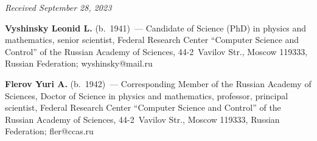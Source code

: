 \vspace*{-6pt}

\hfill{\small\textit{Received September 28, 2023}} 

\vspace*{-18pt}
 
      \Contr

      
  \noindent
  \textbf{Vyshinsky Leonid L.} (b.\ 1941)~--- Candidate of Science (PhD) in physics and 
mathematics, senior scientist, Federal Research Center ``Computer Science and Control'' of the 
Russian Academy of Sciences, 44-2~Vavilov Str., Moscow 119333, Russian Federation; 
\mbox{wyshinsky@mail.ru} 
  
  \vspace*{3pt}
  
  \noindent
  \textbf{Flerov Yuri A.} (b.\ 1942)~--- Corresponding Member of the Russian Academy of 
Sciences, Doctor of Science in physics and mathematics, professor, principal scientist, Federal 
Research Center ``Computer Science and Control'' of the Russian Academy of Sciences, 44-2~Vavilov 
Str., Moscow 119333, Russian Federation; \mbox{fler@ccas.ru}
     
\label{end\stat}

\renewcommand{\bibname}{\protect\rm Литература} 
      